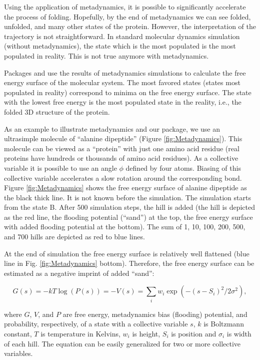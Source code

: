 Using the application of metadynamics, it is possible to significantly accelerate the process
of folding. Hopefully, by the end of metadynamics we can see folded, unfolded, and many
other states of the protein. However, the interpretation of the trajectory is not
straightforward. In standard molecular dynamics simulation (without metadynamics),
the state which is the most populated is the most populated in reality. This is
not true anymore with metadynamics.

Packages  and  use the results of metadynamics simulations
to calculate the free energy surface of the molecular system.
The most favored states (states most populated in reality) correspond to minima
on the free energy surface. The state with the lowest free energy is the most
populated state in the reality, i.e., the folded 3D structure of the protein.

As an example to illustrate metadynamics and our package, we use
an ultrasimple molecule of ``alanine dipeptide''
(Figure \ref{fig:Metadynamics}). This molecule can be viewed as a ``protein'' with
just one amino acid residue (real proteins have hundreds or thousands of amino acid
residues). As a collective variable it is possible to use an angle \(\phi\)
defined by four atoms. Biasing of this collective variable accelerates a slow
rotation around the corresponding bond. Figure \ref{fig:Metadynamics} shows the
free energy surface of alanine dipeptide as the black thick line. It is not known
before the simulation. The simulation starts from the state B. After 500 simulation
steps, the hill is added (the hill is depicted as the red line, the flooding potential (``sand'')
at the top, the free energy surface with added flooding potential at the bottom).
The sum of 1, 10, 100, 200, 500, and 700 hills are depicted as red to blue lines.

At the end of simulation the free energy surface is relatively well flattened
(blue line in Fig. \ref{fig:Metadynamics} bottom). Therefore, the free energy
surface can be estimated as a negative imprint of added ``sand'':

\begin{equation}
G(s) = -kT \log(P(s)) = -V(s) = \sum_i w_i \exp(-(s-S_i)^2/{2 \sigma^2}),
\label{eq:mtd}
\end{equation}

where \(G\), \(V\), and \(P\) are free energy, metadynamics bias (flooding)
potential, and probability,
respectively, of a state with a collective variable \(s\), \(k\) is Boltzmann constant,
\(T\) is temperature in Kelvins, \(w_i\) is height, \(S_i\) is position and \(\sigma_i\)
is width of each hill. The equation can be easily generalized for two or more
collective variables.

